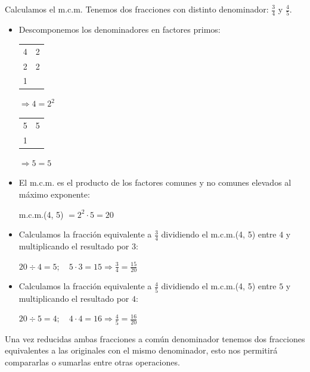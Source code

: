 \begin{ejemplos}[label={Ejemplo:mcm}]{Calculamos el m.c.m.}
    Tenemos dos fracciones con distinto denominador: $\displaystyle \frac{3}{4}$ y $\displaystyle \frac{4}{5}$.

    \begin{itemize}
        \item Descomponemos los denominadores en factores primos:

        \begin{center}
            \begin{tabular}{c|c}
                4 & 2 \\
                2 & 2 \\
                1
            \end{tabular} $\Rightarrow 4 = 2^2$ \qquad
            \begin{tabular}{c|c}
                5 & 5 \\
                1 
            \end{tabular} $\Rightarrow 5 = 5$
        \end{center}

        \item El m.c.m. es el producto de los factores comunes y no comunes elevados al máximo exponente:

        m.c.m.(4, 5) $= 2^2 \cdot 5 = 20$

        \item Calculamos la fracción equivalente a $\displaystyle \frac{3}{4}$ dividiendo el m.c.m.(4, 5) entre $4$ y multiplicando el resultado por $3$:

        \begin{center}
            $\displaystyle 20 \div 4 = 5; \quad 5 \cdot3 = 15 \Rightarrow \frac{3}{4} = \frac{15}{20}$
        \end{center}

        \item Calculamos la fracción equivalente a $\displaystyle \frac{4}{5}$ dividiendo el m.c.m.(4, 5) entre $5$ y multiplicando el resultado por $4$:

        \begin{center}
            $\displaystyle 20 \div 5 = 4; \quad 4 \cdot 4 = 16 \Rightarrow \frac{4}{5} = \frac{16}{20}$
        \end{center}
    \end{itemize}

    Una vez reducidas ambas fracciones a común denominador tenemos dos fracciones equivalentes a las originales con el mismo denominador, esto nos permitirá compararlas o sumarlas entre otras operaciones.
\end{ejemplos}


